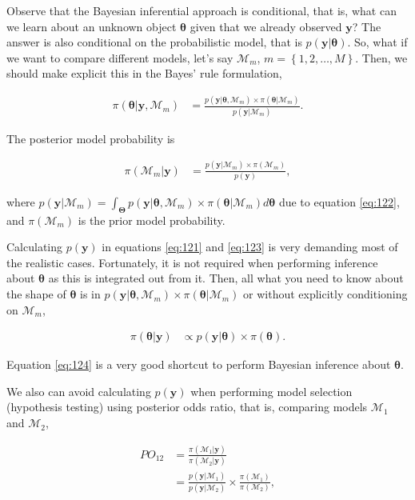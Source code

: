 Observe that the Bayesian inferential approach is conditional, that is, what can we learn about an unknown object $\mathbf{\theta}$ given that we already observed $\mathbf{y}$? The answer is also conditional on the probabilistic model, that is $p(\mathbf{y}|\mathbf{\theta})$. So, what if we want to compare different models, let's say $\mathcal{M}_m$, $m=\left\{1,2,\dots,M\right\}$. Then, we should make explicit this in the Bayes' rule formulation, 

\begin{align}
	\pi(\mathbf{\theta}|\mathbf{y},\mathcal{M}_m)&=\frac{p(\mathbf{y}|\mathbf{\theta},\mathcal{M}_m) \times \pi(\mathbf{\theta}|\mathcal{M}_m)}{p(\mathbf{y}|\mathcal{M}_m)}.
	\label{eq:122}
\end{align}

The posterior model probability is

\begin{align}
	\pi(\mathcal{M}_m|\mathbf{y})&=\frac{p(\mathbf{y}|\mathcal{M}_m) \times \pi(\mathcal{M}_m)}{p(\mathbf{y})}, 
	\label{eq:123}
\end{align}

where $p(\mathbf{y}|\mathcal{M}_m)=\int_{\mathbf{\Theta}}p(\mathbf{y}|\mathbf{\theta},\mathcal{M}_m) \times \pi(\mathbf{\theta}|\mathcal{M}_m)d\mathbf{\theta}$ due to equation \ref{eq:122}, and $\pi(\mathcal{M}_m)$ is the prior model probability. 

Calculating $p(\mathbf{y})$ in equations \ref{eq:121} and \ref{eq:123} is very demanding most of the realistic cases. Fortunately, it is not required when performing inference about $\mathbf{\theta}$ as this is integrated out from it. Then, all what you need to know about the shape of $\mathbf{\theta}$ is in $p(\mathbf{y}|\mathbf{\theta},\mathcal{M}_m) \times \pi(\mathbf{\theta}|\mathcal{M}_m)$ or without explicitly conditioning on $\mathcal{M}_m$,

\begin{align}
	\pi(\mathbf{\theta}|\mathbf{y})& \propto p(\mathbf{y}|\mathbf{\theta}) \times \pi(\mathbf{\theta}).
	\label{eq:124}
\end{align}

Equation \ref{eq:124} is a very good shortcut to perform Bayesian inference about $\mathbf{\theta}$.

We also can avoid calculating $p(\mathbf{y})$ when performing model selection (hypothesis testing) using posterior odds ratio, that is, comparing models $\mathcal{M}_1$ and $\mathcal{M}_2$,

\begin{align}
	PO_{12}&=\frac{\pi(\mathcal{M}_1|\mathbf{y})}{\pi(\mathcal{M}_2|\mathbf{y})} \nonumber \\
	&=\frac{p(\mathbf{y}|\mathcal{M}_1)}{p(\mathbf{y}|\mathcal{M}_2)}\times\frac{\pi(\mathcal{M}_1)}{\pi(\mathcal{M}_2)},
	\label{eq:125}
\end{align}

